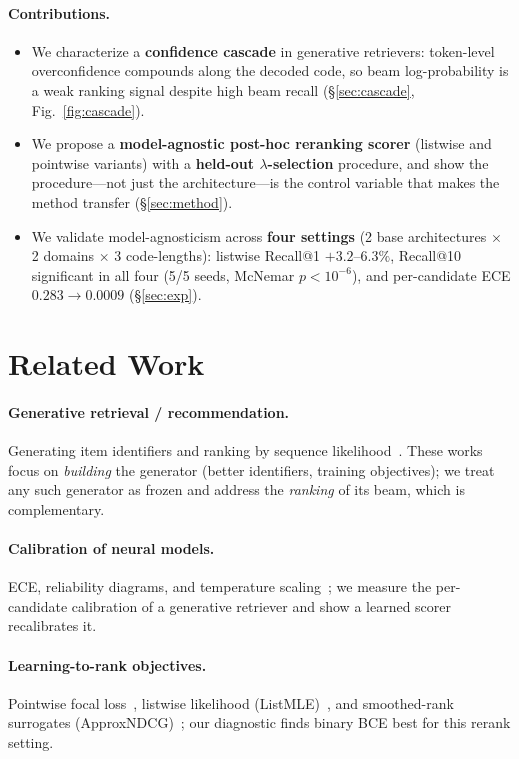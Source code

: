 \documentclass[sigconf,anonymous,review]{acmart}
\begin{document}
\paragraph{Contributions.}
\begin{itemize}
\item We characterize a \textbf{confidence cascade} in generative retrievers: token-level
overconfidence compounds along the decoded code, so beam log-probability is a weak ranking signal
despite high beam recall (\S\ref{sec:cascade}, Fig.~\ref{fig:cascade}).
\item We propose a \textbf{model-agnostic post-hoc reranking scorer} (listwise and pointwise variants)
with a \textbf{held-out $\lambda$-selection} procedure, and show the procedure---not just the
architecture---is the control variable that makes the method transfer (\S\ref{sec:method}).
\item We validate model-agnosticism across \textbf{four settings} (2 base architectures $\times$ 2
domains $\times$ 3 code-lengths): listwise Recall@1 $+3.2$--$6.3\%$, Recall@10 significant in all four
(5/5 seeds, McNemar $p<10^{-6}$), and per-candidate ECE $0.283\to0.0009$ (\S\ref{sec:exp}).
\end{itemize}

\section{Related Work}
\paragraph{Generative retrieval / recommendation.} Generating item identifiers and ranking by
sequence likelihood~\cite{tiger,gram,idgenrec,lcrec,letter}. These works focus on \emph{building} the
generator (better identifiers, training objectives); we treat any such generator as frozen and address
the \emph{ranking} of its beam, which is complementary.
\paragraph{Calibration of neural models.} ECE, reliability diagrams, and temperature
scaling~\cite{guo_calibration}; we measure the per-candidate calibration of a generative retriever and
show a learned scorer recalibrates it.
\paragraph{Learning-to-rank objectives.} Pointwise focal loss~\cite{focal_loss}, listwise
likelihood (ListMLE)~\cite{listmle}, and smoothed-rank surrogates (ApproxNDCG)~\cite{approxndcg}; our
diagnostic finds binary BCE best for this rerank setting.
\end{document}

